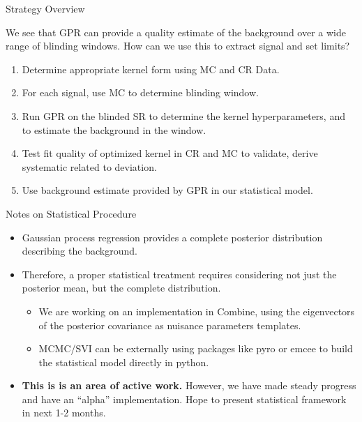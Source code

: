 \documentclass[10pt]{beamer}
\begin{document}
\begin{frame}{Strategy Overview}
  \begin{block}{}
    We see that GPR can provide a quality estimate of the background over a wide range of blinding windows. How can we use this to extract signal and set limits?
  \end{block}
  \begin{enumerate}
  \item Determine appropriate kernel form using MC and CR Data.
  \item For each signal, use MC to determine blinding window. 
  \item Run GPR on the blinded SR to determine the kernel hyperparameters, and to estimate the background in the window.
  \item Test fit quality of optimized kernel in CR and MC to validate, derive systematic related to deviation.
  \item\label{item:5} Use background estimate provided by GPR in our statistical model.
  \end{enumerate}
\end{frame}

\begin{frame}{Notes on Statistical Procedure}
  \begin{itemize}
  \item Gaussian process regression provides a complete posterior distribution describing the background. 
  \item Therefore, a proper statistical treatment requires considering not just the posterior mean, but the complete distribution.
    \begin{itemize}
    \item We are working on an implementation in Combine, using the eigenvectors of the posterior covariance as nuisance parameters templates. 
    \item MCMC/SVI can be externally using packages like pyro or emcee to build the statistical model directly in python.
    \end{itemize}
  \item {\bfseries This is is an area of active work. } However, we have made steady progress and have an ``alpha'' implementation. Hope to present statistical framework in next 1-2 months.
  \end{itemize}
\end{frame}

%   
%   
\end{document}
